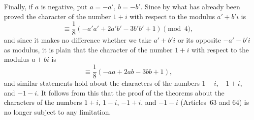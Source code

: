 \documentclass[12pt]{article}
\begin{document}
Finally, if $a$ is negative, put $a=-a'$, $b=-b'$. Since by what has already been proved the character of the number $1+i$ with respect to the modulus $a'+b'i$ is
\[
\equiv \frac18(-a'a'+2a'b'-3b'b'+1)\pmod4,
\]
and since it makes no difference whether we take $a'+b'i$ or its opposite $-a'-b'i$ as modulus, it is plain that the character of the number $1+i$ with respect to the modulus $a+bi$ is
\[
\equiv \frac18(-aa+2ab-3bb+1),
\]
and similar statements hold about the characters of the numbers $1-i$, $-1+i$, and $-1-i$. It follows from this that the proof of the theorems about the characters of the numbers $1+i$, $1-i$, $-1+i$, and $-1-i$ (Articles~63 and 64) is no longer subject to any limitation.
\end{document}
